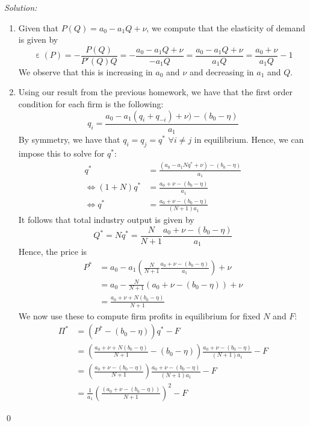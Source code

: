 \documentclass[12pt]{article}
\DeclareMathOperator{\eps}{\varepsilon}
\newenvironment{problem}[2][Problem]{\begin{trivlist}
\item[\hskip \labelsep {\bfseries #1}\hskip \labelsep {\bfseries #2.}]}{\end{trivlist}}
\newenvironment{sol}
    {\emph{Solution:}
    }
    {
    \qed
    }
\begin{document}
\begin{problem}{1}
\end{problem}
\begin{sol}
\begin{enumerate}[label=\alph*) ]
    \item Given that $P(Q) = a_0 - a_1 Q + \nu$, we compute that the elasticity of demand is given by
    \[\eps(P) = -\frac{P(Q)}{P'(Q) Q} = - \frac{a_0 - a_1 Q + \nu}{- a_1 Q} = \frac{a_0 - a_1 Q + \nu}{a_1 Q} = \frac{a_0 + \nu}{a_1 Q} - 1\]
    We observe that this is increasing in $a_0$ and $\nu$ and decreasing in $a_1$ and $Q$.
    \item Using our result from the previous homework, we have that the first order condition for each firm is the following: 
     \[q_i = \frac{a_0 - a_1 (q_i + q_{-i}) + \nu) - (b_0 - \eta)}{a_1}\]
     By symmetry, we have that $q_i = q_{j} = q^*$ $\forall i \neq j$ in equilibrium. Hence, we can impose this to solve for $q^*$:
     \begin{align*}
        q^* &= \frac{(a_0 - a_1 Nq^* + \nu) - (b_0 - \eta)}{a_1}\\
        \iff (1+N)q^* &= \frac{a_0 + \nu - (b_0 - \eta)}{a_1}\\
        \iff q^* &= \frac{a_0 + \nu - (b_0 - \eta)}{(N+1)a_1}
     \end{align*}
     It follows that total industry output is given by
     \[Q^* = N q^* = \frac{N}{N+1}\frac{a_0 + \nu - (b_0 - \eta)}{a_1}\]
     Hence, the price is
     \begin{align*}
        P^* &= a_0 - a_1\left(\frac{N}{N+1}\frac{a_0 + \nu - (b_0 - \eta)}{a_1} \right) + \nu\\
        &= a_0 - \frac{N}{N+1}(a_0 + \nu - (b_0 - \eta)) + \nu\\
        &= \frac{a_0 + \nu + N(b_0 - \eta)}{N+1}
     \end{align*}
     We now use these to compute firm profits in equilibrium for fixed $N$ and $F$:
     \begin{align*}
        \Pi^* &= (P^* - (b_0 - \eta))q^* - F\\
        &= \left(\frac{a_0 + \nu + N(b_0 - \eta)}{N+1} - (b_0 - \eta) \right) \frac{a_0 + \nu - (b_0 - \eta)}{(N+1)a_1} - F\\
        &= \left(\frac{a_0 + \nu - (b_0 - \eta)}{N+1}\right)\frac{a_0 + \nu - (b_0 - \eta)}{(N+1)a_1} - F\\
        &= \frac{1}{a_1}\left(\frac{(a_0 + \nu - (b_0 - \eta))}{N+1}\right)^2 - F
     \end{align*}

\end{enumerate}
\end{sol}
\end{document}
